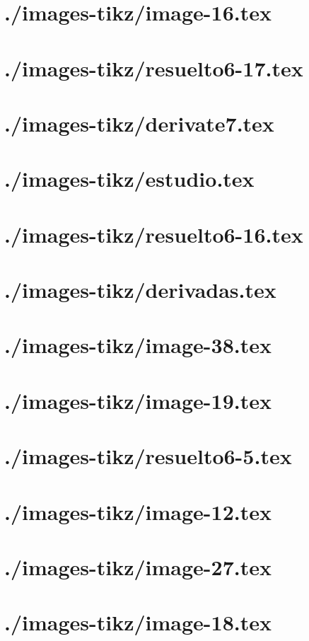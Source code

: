 \documentclass[]{article}
\begin{document}
\section{./images-tikz/image-16.tex} 
\section{./images-tikz/resuelto6-17.tex} 
\section{./images-tikz/derivate7.tex} 
\section{./images-tikz/estudio.tex} 
\section{./images-tikz/resuelto6-16.tex} 
\section{./images-tikz/derivadas.tex} 
\section{./images-tikz/image-38.tex} 
\section{./images-tikz/image-19.tex} 
\section{./images-tikz/resuelto6-5.tex} 
\section{./images-tikz/image-12.tex} 
\section{./images-tikz/image-27.tex} 
\section{./images-tikz/image-18.tex} 
\end{document}
